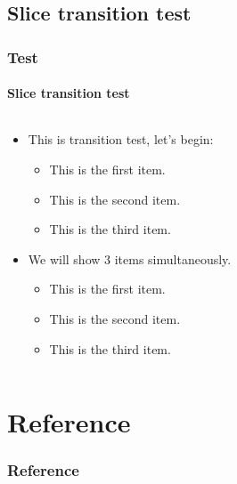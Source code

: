 \documentclass[xcolor={usenames,dvipsnames},aspectratio=169]{beamer}
\begin{document}
\subsection{Slice transition test}
\begin{frame}
\frametitle{Test}
\framesubtitle{Slice transition test}
  \label{sec:slicetrans}
  \begin{columns}
    \begin{column}{.48\textwidth}
      \begin{itemize}
        \item<1-> This is transition test, let's begin:
        \begin{itemize}
          \item<2-> This is the first item.
          \item<3-> This is the second item.
          \item<4-> This is the third item.
        \end{itemize}
        \item<5-> We will show 3 items simultaneously.
        \begin{itemize}
          \item<6-> This is the first item.
          \item<6-> This is the second item.
          \item<6-> This is the third item.
        \end{itemize}
      \end{itemize}
    \end{column}
    \begin{column}{.48\textwidth}
    \end{column}
  \end{columns}
\end{frame}

\section{Reference}
%
\begin{frame}[allowframebreaks]
\frametitle{Reference}
\footnotesize


\end{frame}

\ThankYouFrame
\end{document}
